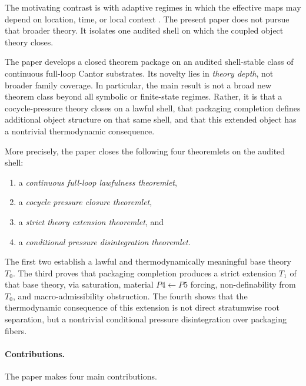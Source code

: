 \documentclass[11pt]{article}
\theoremstyle{definition}
\begin{document}
The motivating contrast is with adaptive regimes in which the effective maps may depend on location, time, or local context \cite{OliveiraVarandasLocalIFS,BarnsleyDemkoEltonGeronimo1988,FalconerRandomFractals1986,RempeGillenUrbanski2016NonAutonomousCIFS}. The present paper does not pursue that broader theory. It isolates one audited shell on which the coupled object theory closes.

The paper develops a closed theorem package on an audited shell-stable class of continuous full-loop Cantor substrates. Its novelty lies in \emph{theory depth}, not broader family coverage. In particular, the main result is not a broad new theorem class beyond all symbolic or finite-state regimes. Rather, it is that a cocycle-pressure theory closes on a lawful shell, that packaging completion defines additional object structure on that same shell, and that this extended object has a nontrivial thermodynamic consequence.

More precisely, the paper closes the following four theoremlets on the audited shell:
\begin{enumerate}
    \item a \emph{continuous full-loop lawfulness theoremlet},
    \item a \emph{cocycle pressure closure theoremlet},
    \item a \emph{strict theory extension theoremlet}, and
    \item a \emph{conditional pressure disintegration theoremlet}.
\end{enumerate}
The first two establish a lawful and thermodynamically meaningful base theory \(T_0\). The third proves that packaging completion produces a strict extension \(T_1\) of that base theory, via saturation, material \(P4 \leftarrow P5\) forcing, non-definability from \(T_0\), and macro-admissibility obstruction. The fourth shows that the thermodynamic consequence of this extension is not direct stratumwise root separation, but a nontrivial conditional pressure disintegration over packaging fibers.

\paragraph{Contributions.}
The paper makes four main contributions.
\end{document}
